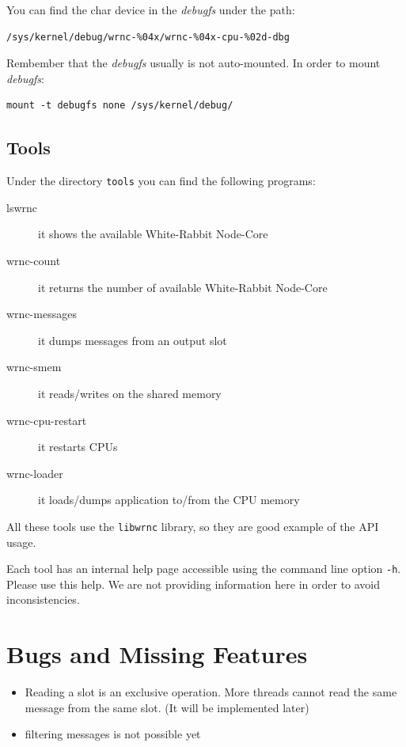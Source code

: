 \documentclass[a4paper,10pt]{article}
\begin{document}
You can find the char device in the \textit{debugfs} under the path:
\begin{verbatim}
/sys/kernel/debug/wrnc-%04x/wrnc-%04x-cpu-%02d-dbg
\end{verbatim}

Rembember that the \textit{debugfs} usually is not auto-mounted. In
order to mount \textit{debugfs}:

\begin{verbatim}
mount -t debugfs none /sys/kernel/debug/
\end{verbatim}

\subsection{Tools}%
Under the directory \texttt{tools} you can find the following
programs:

\begin{description}
  \item[lswrnc] it shows the available White-Rabbit Node-Core
  \item[wrnc-count] it returns the number of available White-Rabbit
    Node-Core
  \item[wrnc-messages] it dumps messages from an output slot
  \item[wrnc-smem] it reads/writes on the shared memory
  \item[wrnc-cpu-restart] it restarts CPUs
  \item[wrnc-loader] it loads/dumps application to/from the CPU memory
\end{description}

All these tools use the \texttt{libwrnc} library, so they are good
example of the API usage.

Each tool has an internal help page accessible using the
command line option \texttt{-h}. Please use this help. We are not
providing information here in order to avoid inconsistencies.

\section{Bugs and Missing Features}%
\begin{itemize}
  \item Reading a slot is an exclusive operation. More threads cannot
    read the same message from the same slot. (It will be implemented
    later)
  \item filtering messages is not possible yet
\end{itemize}
\end{document}
